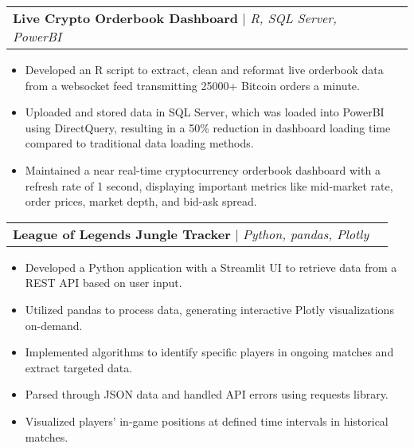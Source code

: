 \documentclass[letterpaper,11pt]{article}
\makeatletter
\newcommand{\resumeItem}[1]{
  \item\small{
    {#1 \vspace{-2pt}}
  }
}
\newcommand{\resumeProjectHeading}[2]{
    \item
    \begin{tabular*}{0.97\textwidth}{l@{\extracolsep{\fill}}r}
      \small#1 & #2 \\
    \end{tabular*}\vspace{-7pt}
}
\newcommand{\resumeItemListStart}{\begin{itemize}}
\newcommand{\resumeItemListEnd}{\end{itemize}\vspace{-5pt}}
\makeatother
\begin{document}
    \resumeProjectHeading
        {\textbf{Live Crypto Orderbook Dashboard} $|$ \emph{R, SQL Server, PowerBI}}{}
        \resumeItemListStart
            \resumeItem{Developed an R script to extract, clean and reformat live orderbook data from a websocket 
            feed transmitting 25000+ Bitcoin orders a minute.}
            \resumeItem{Uploaded and stored data in SQL Server, which was loaded into PowerBI 
            using DirectQuery, resulting in a 50\% reduction in dashboard loading time compared to traditional data loading methods.}
            \resumeItem{Maintained a near real-time cryptocurrency orderbook dashboard with a refresh rate of 1 second, 
            displaying important metrics like mid-market rate, order prices, market depth, 
            and bid-ask spread.}
        \resumeItemListEnd

        \resumeProjectHeading
        {\textbf{League of Legends Jungle Tracker} $|$ \emph{Python, pandas, Plotly}}{}
        \resumeItemListStart
            \resumeItem{Developed a Python application with a Streamlit UI to retrieve data from a REST API based on user input.}
            \resumeItem{Utilized pandas to process data, generating interactive Plotly visualizations on-demand.}
            \resumeItem{Implemented algorithms to identify specific players in ongoing matches and extract targeted data.}
            \resumeItem{Parsed through JSON data and handled API errors using requests library.}
            \resumeItem{Visualized players' in-game positions at defined time intervals in historical matches.}
        \resumeItemListEnd

\end{document}
